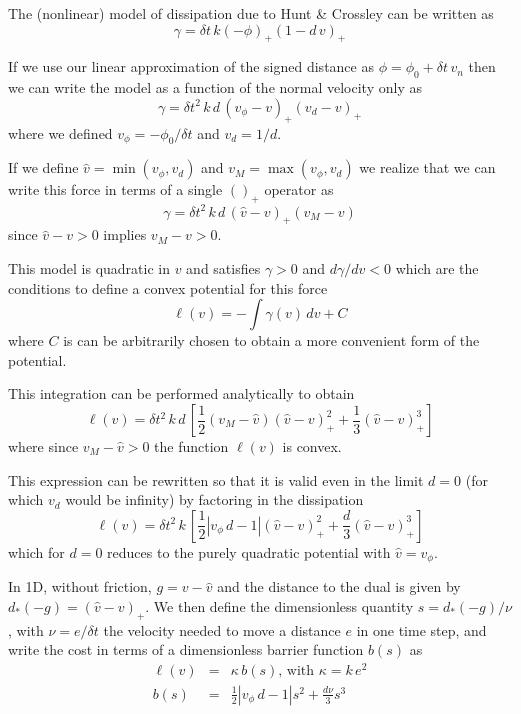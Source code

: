 The (nonlinear) model of dissipation due to Hunt \& Crossley
\cite{bib:hunt_crossley} can be written as 
\begin{equation}
    \gamma = \delta t\,k(-\phi)_+(1-d\,v)_+
\end{equation}

If we use our linear approximation of the signed distance as $\phi=\phi_0+\delta
t\,v_n$ then we can write the model as a function of the normal velocity only as
\begin{equation}
    \gamma = \delta t^2\,k\,d\,(v_\phi-v)_+(v_d-v)_+
\end{equation}
where we defined $v_\phi=-\phi_0/\delta t$ and $v_d=1/d$.

If we define $\hat{v}=\min(v_\phi, v_d)$ and $v_M=\max(v_\phi, v_d)$ we realize
that we can write this force in terms of a single $()_+$ operator as
\begin{equation}
    \gamma = \delta t^2\,k\,d\,(\hat{v}-v)_+(v_M-v)
\end{equation}
since $\hat{v}-v > 0$ implies $v_M-v > 0$.

This model is quadratic in $v$ and satisfies $\gamma > 0$ and $d\gamma/dv < 0$
which are the conditions to define a convex potential for this force
\begin{equation}
    \ell(v) = -\int \gamma(v)\,dv + C
\end{equation}
where $C$ is can be arbitrarily chosen to obtain a more convenient form of the
potential.

This integration can be performed analytically to obtain
\begin{equation}
    \ell(v) = \delta t^2\,k\,d\,\left[ \frac{1}{2}(v_M-\hat{v})(\hat{v}-v)_+^2 + \frac{1}{3}(\hat{v}-v)_+^3 \right]
\end{equation}
where since $v_M-\hat{v} > 0$ the function $\ell(v)$ is convex.

This expression can be rewritten so that it is valid even in the limit $d=0$
(for which $v_d$ would be infinity) by factoring in the dissipation
\begin{equation}
    \ell(v) = \delta t^2\,k\,\left[ \frac{1}{2}|v_\phi\,d-1|(\hat{v}-v)_+^2 + \frac{d}{3}(\hat{v}-v)_+^3 \right]
\end{equation}
which for $d=0$ reduces to the purely quadratic potential with $\hat{v}=v_\phi$.

In 1D, without friction, $g=v-\hat{v}$ and the distance to the dual is given by
$d_*(-g) = (\hat{v}-v)_+$. We then define the dimensionless quantity
$s=d_*(-g)/\nu$, with $\nu=e/\delta t$ the velocity needed to move a distance
$e$ in one time step, and write the cost in terms of a dimensionless barrier
function $b(s)$ as
\begin{eqnarray}
    \ell(v) &=& \kappa\,b(s)\text{, with } \kappa = k\,e^2\\
    b(s) &=& \frac{1}{2}|v_\phi\,d-1|s^2 + \frac{d\nu}{3}s^3
\end{eqnarray}

